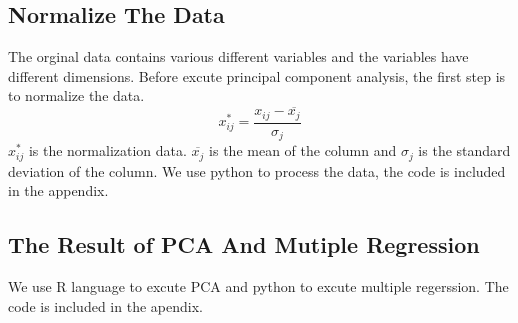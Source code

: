 \documentclass[]{article}
\begin{document}
\subsection{Normalize The Data}
The orginal data contains various different variables and the variables have different dimensions.  Before excute principal component analysis, the first step is to normalize the data.  
\begin{equation}
    x_{ij}^{*} = \frac{x_{ij}-\overline{x_{j}}}{\sigma_{j}}  
\end{equation}
$x_{ij}^{*} $  is the normalization data.  $\overline{x_{j}}$  is the mean of the column and $\sigma_{j}$  is the standard deviation of the column.  We use python to process the data, the code is included in the appendix.
\subsection{The Result of  PCA And Mutiple Regression}


We use R language to excute PCA and python to excute multiple regerssion. The code is included in the apendix.
\end{document}
